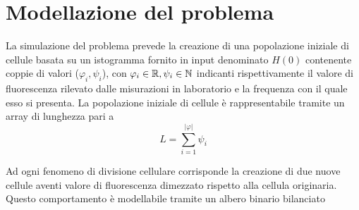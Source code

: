 \section{Modellazione del problema}

La simulazione del problema prevede la creazione di una popolazione iniziale
di cellule basata su un istogramma fornito in input denominato $H(0)$
contenente coppie di valori ($\varphi_{i}, \psi_{i}$),
con $\varphi_{i} \in \mathbb{R}, \psi_{i} \in \mathbb{N}$ indicanti rispettivamente il
valore di fluorescenza rilevato dalle misurazioni in laboratorio e
la frequenza con il quale esso si presenta.
La popolazione iniziale di cellule è rappresentabile tramite un array di
lunghezza pari a $$L = \sum_{i=1}^{|\varphi|} \psi_{i}$$

\begin{figure}[H]
\centering
{}
\caption{}
\end{figure}

Ad ogni fenomeno di divisione cellulare corrisponde
la creazione di due nuove cellule aventi valore di fluorescenza dimezzato
rispetto alla cellula originaria.
Questo comportamento è modellabile tramite un albero binario bilanciato

\begin{figure}[H]
\centering
{}
\caption{}
\end{figure}

